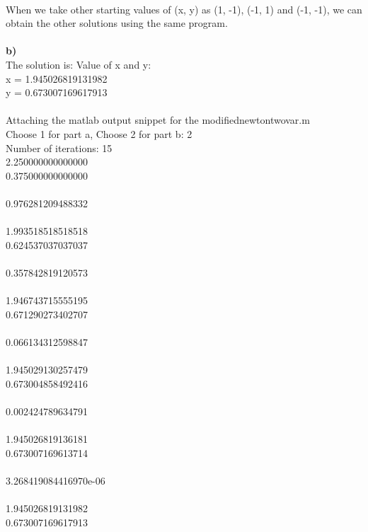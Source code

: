 \documentclass{article}
\begin{document}
\\
When we take other starting values of (x, y) as (1, -1), (-1, 1) and (-1, -1), we can obtain the other solutions using the same program.\\
\\
{\bf b)}\\
The solution is: Value of x and y: \\
x = 1.945026819131982\\
   y = 0.673007169617913\\
\\
Attaching the matlab output snippet for the modifiednewtontwovar.m\\
Choose 1 for part a, Choose 2 for part b: 2\\
Number of iterations: 15\\
   2.250000000000000\\
   0.375000000000000\\
\\
   0.976281209488332\\
\\
   1.993518518518518\\
   0.624537037037037\\
\\
   0.357842819120573\\
\\
   1.946743715555195\\
   0.671290273402707\\
\\
   0.066134312598847\\
\\
   1.945029130257479\\
   0.673004858492416\\
\\
   0.002424789634791\\
\\
   1.945026819136181\\
   0.673007169613714\\
\\
     3.268419084416970e-06\\
\\
   1.945026819131982\\
   0.673007169617913\\
\end{document}

